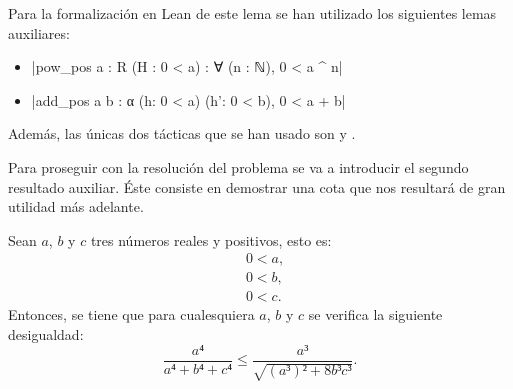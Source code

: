 Para la formalización en Lean de este lema se han utilizado los
siguientes lemas auxiliares:
\begin{itemize}
\item {}|pow_pos {a : R} (H : 0 < a) : ∀ (n : ℕ), 0 < a ^ n|
\item {}|add_pos {a b : α} (h: 0 < a) (h': 0 < b), 0 < a + b|
\end{itemize}

Además, las únicas dos tácticas que se han usado son
 y
.

Para proseguir con la resolución del problema se va a introducir el
segundo resultado auxiliar. Éste consiste en demostrar una cota que
nos resultará de gran utilidad más adelante.

\begin{lema}\label{lemacota}
  Sean \(a\), \(b\) y \(c\) tres números reales y positivos, esto es:
  \begin{align}
    &0<a, \label{haq22}\tag{ha}\\
    &0<b, \label{hbq22}\tag{hb}\\
    &0<c. \label{hcq22}\tag{hc}
  \end{align}
  Entonces, se tiene que para cualesquiera \(a\), \(b\) y \(c\) se
  verifica la siguiente desigualdad:
  \begin{equation}\label{eqcota}
    \frac{a⁴}{a⁴+b⁴+c⁴} ≤ \frac{a³}{\sqrt{(a³)²+8b³c³}}.
  \end{equation}
\end{lema}

